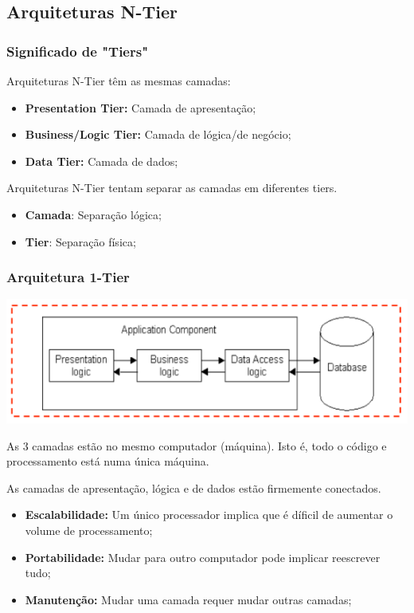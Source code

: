 \documentclass{article}
\begin{document}
\subsection{Arquiteturas N-Tier}

\subsubsection{Significado de "Tiers"}

\begin{flushleft}
  Arquiteturas N-Tier têm as mesmas camadas:
  \begin{itemize}
    \item \textbf{Presentation Tier:} Camada de apresentação;
    \item \textbf{Business/Logic Tier:} Camada de lógica/de negócio;
    \item \textbf{Data Tier:} Camada de dados;
  \end{itemize}

  Arquiteturas N-Tier tentam separar as camadas em diferentes tiers.
  \begin{itemize}
    \item \textbf{Camada}: Separação lógica;
    \item \textbf{Tier}: Separação física;
  \end{itemize}
\end{flushleft}

\subsubsection{Arquitetura 1-Tier}

\begin{center}
  \includegraphics[scale=0.4]{3}
\end{center}

\begin{flushleft}
  As 3 camadas estão no mesmo computador (máquina). Isto é, todo o código e processamento
  está numa única máquina.

  As camadas de apresentação, lógica e de dados estão firmemente conectados.
  \begin{itemize}
    \item \textbf{Escalabilidade:} Um único processador implica que é díficil de
    aumentar o volume de processamento;
    \item \textbf{Portabilidade:} Mudar para outro computador pode implicar
    reescrever tudo;
    \item \textbf{Manutenção:} Mudar uma camada requer mudar outras camadas;
  \end{itemize}
\end{flushleft}
\end{document}
